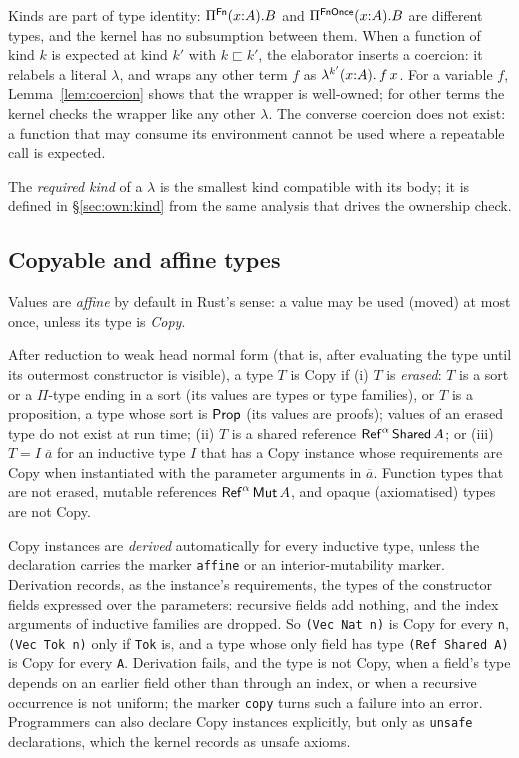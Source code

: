Kinds are part of type identity: $\Pi^{\mathsf{Fn}}(x{:}A).B$ and $\Pi^{\mathsf{FnOnce}}(x{:}A).B$ are different types, and the kernel has no subsumption between them.
When a function of kind $k$ is expected at kind $k'$ with $k \sqsubset k'$, the elaborator inserts a coercion: it relabels a literal $\lambda$, and wraps any other term $f$ as $\lambda^{k'}(x{:}A).\,f\,x$.
For a variable $f$, Lemma~\ref{lem:coercion} shows that the wrapper is well-owned; for other terms the kernel checks the wrapper like any other $\lambda$.
The converse coercion does not exist: a function that may consume its environment cannot be used where a repeatable call is expected.

The \emph{required kind} of a $\lambda$ is the smallest kind compatible with its body; it is defined in \S\ref{sec:own:kind} from the same analysis that drives the ownership check.

\subsection{Copyable and affine types}\label{sec:core:copy}

Values are \emph{affine} by default in Rust's sense: a value may be used (moved) at most once, unless its type is \emph{Copy}.

\begin{definition}[Copy]\label{def:copy}
After reduction to weak head normal form (that is, after evaluating the type until its outermost constructor is visible), a type $T$ is Copy if
(i) $T$ is \emph{erased}: $T$ is a sort or a $\Pi$-type ending in a sort (its values are types or type families), or $T$ is a proposition, a type whose sort is $\mathsf{Prop}$ (its values are proofs); values of an erased type do not exist at run time;
(ii) $T$ is a shared reference $\mathsf{Ref}^{\alpha}\,\mathsf{Shared}\,A$;
or (iii) $T = I\;\overline{a}$ for an inductive type $I$ that has a Copy instance whose requirements are Copy when instantiated with the parameter arguments in $\overline{a}$.
Function types that are not erased, mutable references $\mathsf{Ref}^{\alpha}\,\mathsf{Mut}\,A$, and opaque (axiomatised) types are not Copy.
\end{definition}

Copy instances are \emph{derived} automatically for every inductive type, unless the declaration carries the marker \lstinline|affine| or an interior-mutability marker.
Derivation records, as the instance's requirements, the types of the constructor fields expressed over the parameters: recursive fields add nothing, and the index arguments of inductive families are dropped.
So \lstinline|(Vec Nat n)| is Copy for every \lstinline|n|, \lstinline|(Vec Tok n)| only if \lstinline|Tok| is, and a type whose only field has type \lstinline|(Ref Shared A)| is Copy for every \lstinline|A|.
Derivation fails, and the type is not Copy, when a field's type depends on an earlier field other than through an index, or when a recursive occurrence is not uniform; the marker \lstinline|copy| turns such a failure into an error.
Programmers can also declare Copy instances explicitly, but only as \lstinline|unsafe| declarations, which the kernel records as unsafe axioms.

